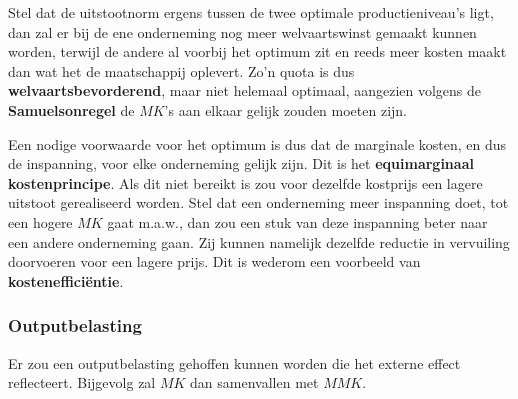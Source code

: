 Stel dat de uitstootnorm ergens tussen de twee optimale productieniveau's ligt, dan zal er bij de ene onderneming nog meer welvaartswinst gemaakt kunnen worden, terwijl de andere al voorbij het optimum zit en reeds meer kosten maakt dan wat het de maatschappij oplevert. Zo'n quota is dus \textbf{welvaartsbevorderend}, maar niet helemaal optimaal, aangezien volgens de \textbf{Samuelsonregel} de $MK$'s aan elkaar gelijk zouden moeten zijn.

Een nodige voorwaarde voor het optimum is dus dat de marginale kosten, en dus de inspanning, voor elke onderneming gelijk zijn. Dit is het \textbf{equimarginaal kostenprincipe}. Als dit niet bereikt is zou voor dezelfde kostprijs een lagere uitstoot gerealiseerd worden. Stel dat een onderneming meer inspanning doet, tot een hogere $MK$ gaat m.a.w., dan zou een stuk van deze inspanning beter naar een andere onderneming gaan. Zij kunnen namelijk dezelfde reductie in vervuiling doorvoeren voor een lagere prijs. Dit is wederom een voorbeeld van \textbf{kosteneffici\"entie}.

\subsubsection{Outputbelasting}
Er zou een outputbelasting gehoffen kunnen worden die het externe effect reflecteert. Bijgevolg zal $MK$ dan samenvallen met $MMK$.
